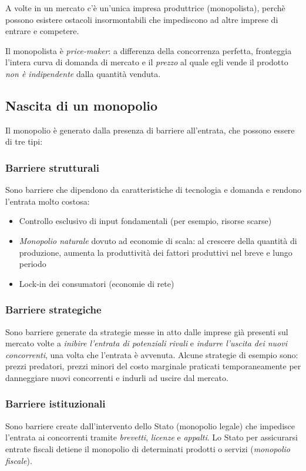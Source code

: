 A volte in un mercato c’è un’unica impresa produttrice (monopolista), perchè possono esistere ostacoli insormontabili che impediscono ad altre imprese di entrare
e competere.

Il monopolista è \emph{price-maker}: a differenza della concorrenza perfetta, fronteggia l’intera curva di domanda di mercato e il \emph{prezzo} al quale egli vende il prodotto \emph{non è indipendente} dalla quantità venduta.

\subsection{Nascita di un monopolio}
Il monopolio è generato dalla presenza di barriere all’entrata, che possono essere di tre tipi:

\subsubsection{Barriere strutturali}
Sono barriere che dipendono da caratteristiche di tecnologia e domanda e rendono l’entrata molto costosa:
\begin{itemize}
	\item Controllo esclusivo di input fondamentali (per esempio, risorse scarse)
	\item \emph{Monopolio naturale} dovuto ad economie di scala: al crescere della quantità di produzione, aumenta la
	produttività dei fattori produttivi nel breve e lungo periodo
	\item Lock-in dei consumatori (economie di rete)
\end{itemize}

\subsubsection{Barriere strategiche}
Sono barriere generate da strategie messe in atto dalle imprese già presenti sul mercato volte a \emph{inibire l’entrata di potenziali rivali}
e \emph{indurre l’uscita dei nuovi concorrenti}, una volta che l’entrata è avvenuta. Alcune strategie di esempio sono: prezzi predatori, prezzi minori del costo marginale praticati temporaneamente per
danneggiare nuovi concorrenti e indurli ad uscire dal mercato.

\subsubsection{Barriere istituzionali}
Sono barriere create dall’intervento dello Stato (monopolio legale) che impedisce l’entrata ai
concorrenti tramite \emph{brevetti}, \emph{licenze} e \emph{appalti}.
Lo Stato per assicurarsi entrate fiscali detiene il monopolio di determinati
prodotti o servizi (\emph{monopolio fiscale}).

